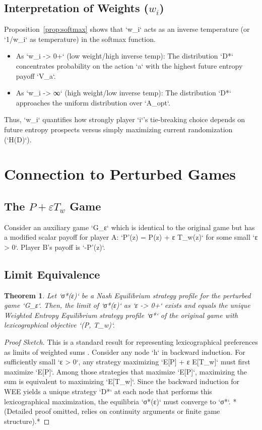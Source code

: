 \documentclass{article}
\newtheorem{theorem}{Theorem}[section]
\begin{document}
\subsection{Interpretation of Weights (\texorpdfstring{$w_i$}{wi})}
Proposition~\ref{prop:softmax} shows that `w_i` acts as an inverse temperature (or `1/w_i` as temperature) in the softmax function.
\begin{itemize}
    \item As `w_i -> 0+` (low weight/high inverse temp): The distribution `D*` concentrates probability on the action `a` with the highest future entropy payoff `V_a`.
    \item As `w_i -> ∞` (high weight/low inverse temp): The distribution `D*` approaches the uniform distribution over `A_opt`.
\end{itemize}
Thus, `w_i` quantifies how strongly player `i`'s tie-breaking choice depends on future entropy prospects versus simply maximizing current randomization (`H(D)`).

\section{Connection to Perturbed Games}

\subsection{The \texorpdfstring{$P + ε T_w$}{P + epsilon Tw} Game}
Consider an auxiliary game `G_ε` which is identical to the original game but has a modified scalar payoff for player A: `P'(z) = P(z) + ε T_w(z)` for some small `ε > 0`. Player B's payoff is `-P'(z)`.

\subsection{Limit Equivalence}
\begin{theorem} \label{thm:limit}
Let `σ*(ε)` be a Nash Equilibrium strategy profile for the perturbed game `G_ε`. Then, the limit of `σ*(ε)` as `ε -> 0+` exists and equals the unique Weighted Entropy Equilibrium strategy profile `σ*` of the original game with lexicographical objective `(P, T_w)`.
\end{theorem}
\begin{proof}[Proof Sketch]
This is a standard result for representing lexicographical preferences as limits of weighted sums \cite{placeholder_lexico_limit}. Consider any node `h` in backward induction. For sufficiently small `ε > 0`, any strategy maximizing `E[P] + ε E[T_w]` must first maximize `E[P]`. Among those strategies that maximize `E[P]`, maximizing the sum is equivalent to maximizing `E[T_w]`. Since the backward induction for WEE yields a unique strategy `D*` at each node that performs this lexicographical maximization, the equilibria `σ*(ε)` must converge to `σ*`. *(Detailed proof omitted, relies on continuity arguments or finite game structure).*
\end{proof}
\end{document}
